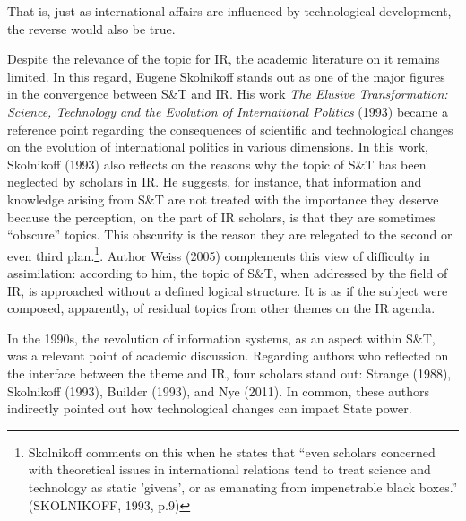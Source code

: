 That is, just as international affairs are influenced by technological development, the reverse would also be true.

Despite the relevance of the topic for IR, the academic literature on it remains limited. In this regard, Eugene Skolnikoff stands out as one of the major figures in the convergence between S\&T and IR. His work \textit{The Elusive Transformation: Science, Technology and the Evolution of International Politics} (1993) became a reference point regarding the consequences of scientific and technological changes on the evolution of international politics in various dimensions. In this work, Skolnikoff (1993) also reflects on the reasons why the topic of S\&T has been neglected by scholars in IR. He suggests, for instance, that information and knowledge arising from S\&T are not treated with the importance they deserve because the perception, on the part of IR scholars, is that they are sometimes “obscure” topics. This obscurity is the reason they are relegated to the second or even third plan.\footnote{Skolnikoff comments on this when he states that “even scholars concerned with theoretical issues in international relations tend to treat science and technology as static 'givens', or as emanating from impenetrable black boxes.” (SKOLNIKOFF, 1993, p.9)}. Author Weiss (2005) complements this view of difficulty in assimilation: according to him, the topic of S\&T, when addressed by the field of IR, is approached without a defined logical structure. It is as if the subject were composed, apparently, of residual topics from other themes on the IR agenda.

In the 1990s, the revolution of information systems, as an aspect within S\&T, was a relevant point of academic discussion. Regarding authors who reflected on the interface between the theme and IR, four scholars stand out: Strange (1988), Skolnikoff (1993), Builder (1993), and Nye (2011). In common, these authors indirectly pointed out how technological changes can impact State power.


